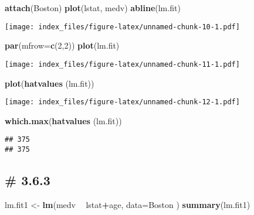 \documentclass[
]{article}
\newenvironment{Shaded}{\begin{snugshade}}{\end{snugshade}}
\newcommand{\DataTypeTok}[1]{\textcolor[rgb]{0.13,0.29,0.53}{#1}}
\newcommand{\DecValTok}[1]{\textcolor[rgb]{0.00,0.00,0.81}{#1}}
\newcommand{\KeywordTok}[1]{\textcolor[rgb]{0.13,0.29,0.53}{\textbf{#1}}}
\newcommand{\NormalTok}[1]{#1}
\newcommand{\OperatorTok}[1]{\textcolor[rgb]{0.81,0.36,0.00}{\textbf{#1}}}
\newcommand{\StringTok}[1]{\textcolor[rgb]{0.31,0.60,0.02}{#1}}
\begin{document}
\begin{Shaded}
\begin{Highlighting}[]
\KeywordTok{attach}\NormalTok{(Boston)}
\KeywordTok{plot}\NormalTok{(lstat, medv)}
\KeywordTok{abline}\NormalTok{(lm.fit)}
\end{Highlighting}
\end{Shaded}

\texttt{[image: index\_files/figure-latex/unnamed-chunk-10-1.pdf]}

\begin{Shaded}
\begin{Highlighting}[]
\KeywordTok{par}\NormalTok{(}\DataTypeTok{mfrow=}\KeywordTok{c}\NormalTok{(}\DecValTok{2}\NormalTok{,}\DecValTok{2}\NormalTok{))}
\KeywordTok{plot}\NormalTok{(lm.fit)}
\end{Highlighting}
\end{Shaded}

\texttt{[image: index\_files/figure-latex/unnamed-chunk-11-1.pdf]}

\begin{Shaded}
\begin{Highlighting}[]
\KeywordTok{plot}\NormalTok{(}\KeywordTok{hatvalues}\NormalTok{ (lm.fit))}
\end{Highlighting}
\end{Shaded}

\texttt{[image: index\_files/figure-latex/unnamed-chunk-12-1.pdf]}

\begin{Shaded}
\begin{Highlighting}[]
\KeywordTok{which.max}\NormalTok{(}\KeywordTok{hatvalues}\NormalTok{ (lm.fit))}
\end{Highlighting}
\end{Shaded}

\begin{verbatim}
## 375 
## 375
\end{verbatim}

\hypertarget{section-2}{%
\subsection{\# 3.6.3}\label{section-2}}

\begin{Shaded}
\begin{Highlighting}[]
\NormalTok{lm.fit1 <-}\StringTok{ }\KeywordTok{lm}\NormalTok{(medv }\OperatorTok{~}\StringTok{ }\NormalTok{lstat}\OperatorTok{+}\NormalTok{age, }\DataTypeTok{data=}\NormalTok{Boston )}
\KeywordTok{summary}\NormalTok{(lm.fit1)}
\end{Highlighting}
\end{Shaded}
\end{document}
